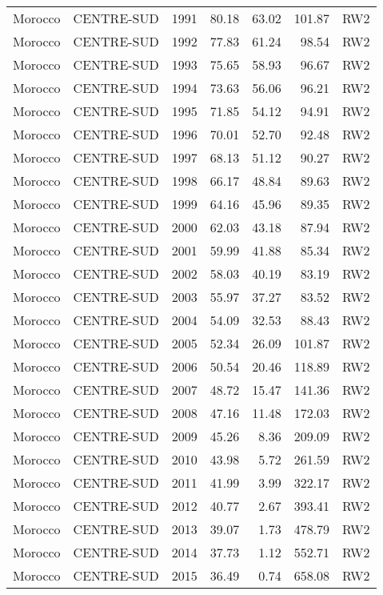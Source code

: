 \begin{longtable}{lllrrrl}
  Morocco & CENTRE-SUD & 1991 & 80.18 & 63.02 & 101.87 & RW2 \\ 
  Morocco & CENTRE-SUD & 1992 & 77.83 & 61.24 & 98.54 & RW2 \\ 
  Morocco & CENTRE-SUD & 1993 & 75.65 & 58.93 & 96.67 & RW2 \\ 
  Morocco & CENTRE-SUD & 1994 & 73.63 & 56.06 & 96.21 & RW2 \\ 
  Morocco & CENTRE-SUD & 1995 & 71.85 & 54.12 & 94.91 & RW2 \\ 
  Morocco & CENTRE-SUD & 1996 & 70.01 & 52.70 & 92.48 & RW2 \\ 
  Morocco & CENTRE-SUD & 1997 & 68.13 & 51.12 & 90.27 & RW2 \\ 
  Morocco & CENTRE-SUD & 1998 & 66.17 & 48.84 & 89.63 & RW2 \\ 
  Morocco & CENTRE-SUD & 1999 & 64.16 & 45.96 & 89.35 & RW2 \\ 
  Morocco & CENTRE-SUD & 2000 & 62.03 & 43.18 & 87.94 & RW2 \\ 
  Morocco & CENTRE-SUD & 2001 & 59.99 & 41.88 & 85.34 & RW2 \\ 
  Morocco & CENTRE-SUD & 2002 & 58.03 & 40.19 & 83.19 & RW2 \\ 
  Morocco & CENTRE-SUD & 2003 & 55.97 & 37.27 & 83.52 & RW2 \\ 
  Morocco & CENTRE-SUD & 2004 & 54.09 & 32.53 & 88.43 & RW2 \\ 
  Morocco & CENTRE-SUD & 2005 & 52.34 & 26.09 & 101.87 & RW2 \\ 
  Morocco & CENTRE-SUD & 2006 & 50.54 & 20.46 & 118.89 & RW2 \\ 
  Morocco & CENTRE-SUD & 2007 & 48.72 & 15.47 & 141.36 & RW2 \\ 
  Morocco & CENTRE-SUD & 2008 & 47.16 & 11.48 & 172.03 & RW2 \\ 
  Morocco & CENTRE-SUD & 2009 & 45.26 & 8.36 & 209.09 & RW2 \\ 
  Morocco & CENTRE-SUD & 2010 & 43.98 & 5.72 & 261.59 & RW2 \\ 
  Morocco & CENTRE-SUD & 2011 & 41.99 & 3.99 & 322.17 & RW2 \\ 
  Morocco & CENTRE-SUD & 2012 & 40.77 & 2.67 & 393.41 & RW2 \\ 
  Morocco & CENTRE-SUD & 2013 & 39.07 & 1.73 & 478.79 & RW2 \\ 
  Morocco & CENTRE-SUD & 2014 & 37.73 & 1.12 & 552.71 & RW2 \\ 
  Morocco & CENTRE-SUD & 2015 & 36.49 & 0.74 & 658.08 & RW2 \\ 

\end{longtable}
